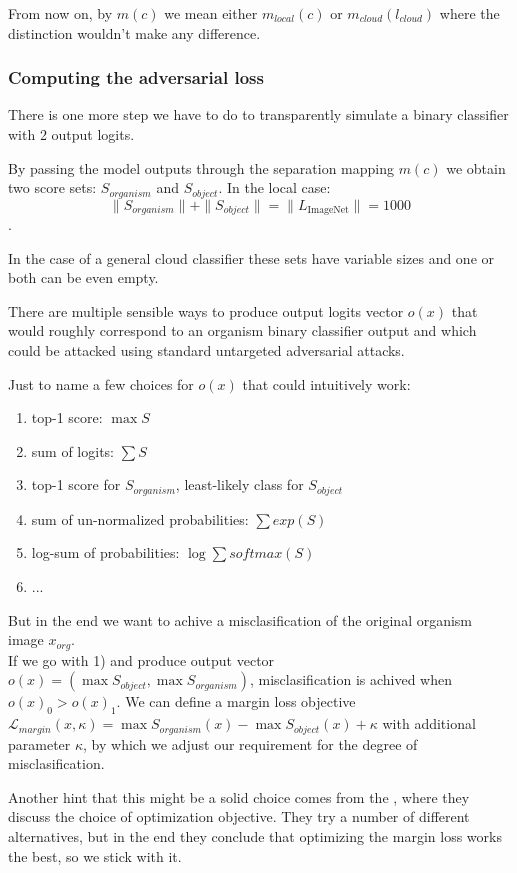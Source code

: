 From now on, by $m(c)$ we mean either $m_{local}(c)$ or $m_{cloud}(l_{cloud})$ where the distinction wouldn't make any difference.

\subsubsection{Computing the adversarial loss}
\label{computing_the_loss}
There is one more step we have to do to transparently simulate a binary classifier with 2 output logits.

By passing the model outputs through the separation mapping $m(c)$ we obtain two score sets: $S_{organism}$ and $S_{object}$. In the local case:
$$\|S_{organism}\| + \|S_{object}\| = \|L_{\text{ImageNet}}\| = 1000$$.

In the case of a general cloud classifier these sets have variable sizes and one or both can be even empty.

There are multiple sensible ways to produce output logits vector $o(x)$ that would roughly correspond to an organism binary classifier output and which could be attacked using standard untargeted adversarial attacks.

Just to name a few choices for $o(x)$ that could intuitively work:
\begin{enumerate}
    \item top-1 score: $\max S$ 
    \item sum of logits: $\sum S$
    \item top-1 score for $S_{organism}$, least-likely class for $S_{object}$
        
    \item sum of un-normalized probabilities: $\sum exp(S)$
    \item log-sum of probabilities: $\log \sum softmax(S)$
    \item ...
\end{enumerate}

But in the end we want to achive a misclasification of the original organism image $x_{org}$. \\ If we go with 1) and produce output vector $o(x) = (\max S_{object}, \max S_{organism})$, misclasification is achived when $o(x)_0 > o(x)_1$. We can define a margin loss objective $\mathcal{L}_{margin}(x, \kappa) = \max S_{organism}(x) - \max S_{object}(x) + \kappa$ with additional parameter $\kappa$, by which we adjust our requirement for the degree of misclasification.

Another hint that this might be a solid choice comes from the \cite{carlini2017evaluating}, where they discuss the choice of optimization objective. They try a number of different alternatives, but in the end they conclude that optimizing the margin loss works the best, so we stick with it.

